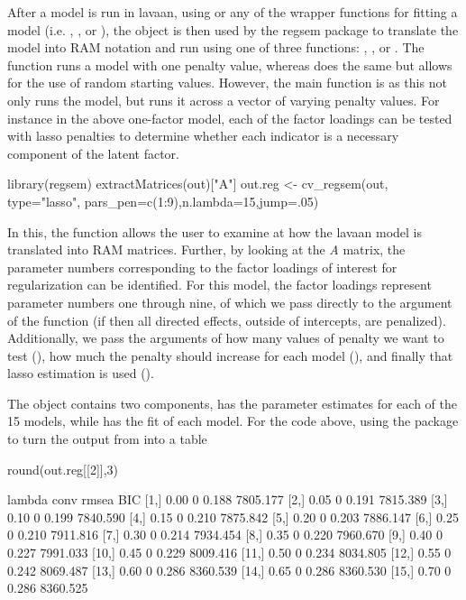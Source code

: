 \documentclass[article]{jss}
\begin{document}
After a model is run in lavaan, using  or any of the
wrapper functions for fitting a model (i.e. , ,
or ), the object is then used by the regsem package to
translate the model into RAM notation and run using one of three
functions: , , or .
The  function runs a model with one penalty value,
whereas  does the same but allows for the use of
random starting values. However, the main function is 
as this not only runs the model, but runs it across a vector of varying
penalty values. For instance in the above one-factor model, each of the
factor loadings can be tested with lasso penalties to determine whether
each indicator is a necessary component of the latent factor.

\begin{CodeChunk}
\begin{CodeInput}
library(regsem)
extractMatrices(out)["A"]
out.reg <- cv_regsem(out, type="lasso", 
                    pars_pen=c(1:9),n.lambda=15,jump=.05)
\end{CodeInput}
\end{CodeChunk}

In this, the function  allows the user to
examine at how the lavaan model is translated into RAM matrices.
Further, by looking at the \textit{A} matrix, the parameter numbers
corresponding to the factor loadings of interest for regularization can
be identified. For this model, the factor loadings represent parameter
numbers one through nine, of which we pass directly to the
 argument of the  function (if
 then all directed effects, outside of intercepts,
are penalized). Additionally, we pass the arguments of how many values
of penalty we want to test (), how much the penalty
should increase for each model (), and finally that lasso
estimation is used ().

The  object contains two components, 
has the parameter estimates for each of the 15 models, while
 has the fit of each model. For the code above, using
the  package to turn the output from 
into a table

\begin{CodeChunk}
\begin{CodeInput}
round(out.reg[[2]],3)
\end{CodeInput}
\begin{CodeOutput}
      lambda conv rmsea      BIC
 [1,]   0.00    0 0.188 7805.177
 [2,]   0.05    0 0.191 7815.389
 [3,]   0.10    0 0.199 7840.590
 [4,]   0.15    0 0.210 7875.842
 [5,]   0.20    0 0.203 7886.147
 [6,]   0.25    0 0.210 7911.816
 [7,]   0.30    0 0.214 7934.454
 [8,]   0.35    0 0.220 7960.670
 [9,]   0.40    0 0.227 7991.033
[10,]   0.45    0 0.229 8009.416
[11,]   0.50    0 0.234 8034.805
[12,]   0.55    0 0.242 8069.487
[13,]   0.60    0 0.286 8360.539
[14,]   0.65    0 0.286 8360.530
[15,]   0.70    0 0.286 8360.525
\end{CodeOutput}
\end{CodeChunk}
\end{document}
